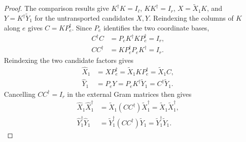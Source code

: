 \begin{proof}\leanok
    The comparison results give $K^\dagger K=I_\ell$, $KK^\dagger=I_r$,
    $X=\widetilde X_1K$, and $Y=K^\dagger\widetilde Y_1$ for the
    untransported candidates $X,Y$. Reindexing the columns of $K$
    along $e$ gives $C=KP_e^\dagger$. Since $P_e$ identifies the two
    coordinate bases,
    \begin{align}
        C^\dagger C & =P_eK^\dagger KP_e^\dagger=I_r, \\
        CC^\dagger  & =KP_e^\dagger P_eK^\dagger=I_r.
    \end{align}
    Reindexing the two candidate factors gives
    \begin{align}
        \widehat X_1 & =XP_e^\dagger
        =\widetilde X_1KP_e^\dagger=\widetilde X_1C, \\
        \widehat Y_1 & =P_eY
        =P_eK^\dagger\widetilde Y_1=C^\dagger\widetilde Y_1.
    \end{align}
    Cancelling $CC^\dagger=I_r$ in the external Gram matrices then gives
    \begin{align}
        \widehat X_1\widehat X_1^\dagger
         & =\widetilde X_1(CC^\dagger)\widetilde X_1^\dagger
        =\widetilde X_1\widetilde X_1^\dagger,               \\
        \widehat Y_1^\dagger\widehat Y_1
         & =\widetilde Y_1^\dagger(CC^\dagger)\widetilde Y_1
        =\widetilde Y_1^\dagger\widetilde Y_1.
    \end{align}
\end{proof}

